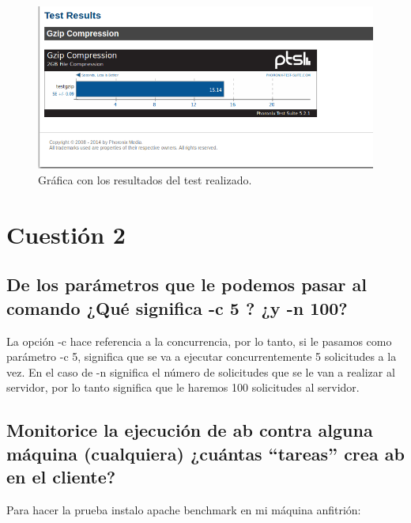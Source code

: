 \begin{figure}[H] %
	\centering
	\includegraphics[scale=0.5]{imagenes/graphic-gzip.png}  %
	\caption{Gráfica con los resultados del test realizado.}
\end{figure}


\section{Cuestión 2}
\subsection{\Large De los parámetros que le podemos pasar al comando ¿Qué significa -c 5 ? ¿y -n 100?}

La opción -c hace referencia a la concurrencia, por lo tanto, si le pasamos como parámetro -c 5, significa que se va a ejecutar concurrentemente 5 solicitudes a la vez.
En el caso de -n significa el número de solicitudes que se le van a realizar al servidor, por lo tanto significa que le haremos 100 solicitudes al servidor. \cite{ab}

\subsection{\Large Monitorice la ejecución de ab contra alguna máquina (cualquiera) ¿cuántas “tareas” crea ab en el cliente?}

Para hacer la prueba instalo apache benchmark en mi máquina anfitrión:

